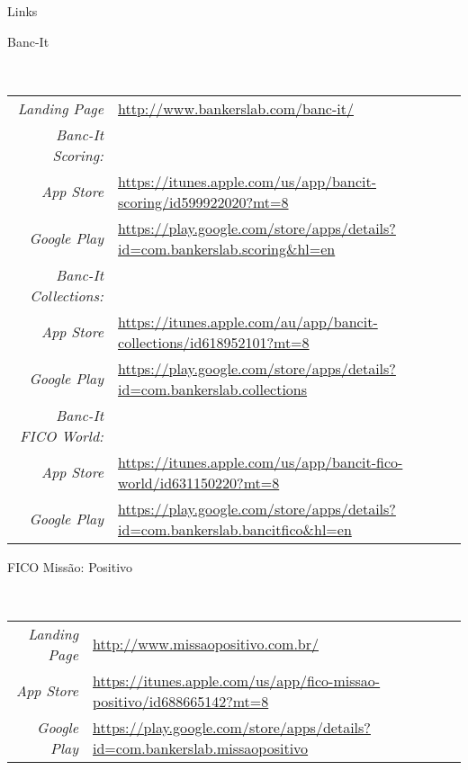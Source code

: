 \documentclass[a4paper,10pt]{article}
\begin{document}
\newpage
\par{\centering\LARGE{Links} \par}
\hfill
\par{\centering\Large \hypertarget{bancit-links}{Banc-It}\par}
\hrulefill\\
\newline
\begin{tabular}{rl}
    \textit{Landing Page} & \url{http://www.bankerslab.com/banc-it/}\\
    \textit{Banc-It Scoring:}\\
        \textit{App Store} & \small \url{https://itunes.apple.com/us/app/bancit-scoring/id599922020?mt=8}\\
        \textit{Google Play} & \small \url{https://play.google.com/store/apps/details?id=com.bankerslab.scoring\&hl=en}\\
    \textit{Banc-It Collections:}\\
        \textit{App Store} & \small \url{https://itunes.apple.com/au/app/bancit-collections/id618952101?mt=8}\\
        \textit{Google Play} & \small \url{https://play.google.com/store/apps/details?id=com.bankerslab.collections}\\
    \textit{Banc-It FICO World:}\\
        \textit{App Store} & \small \url{https://itunes.apple.com/us/app/bancit-fico-world/id631150220?mt=8}\\
        \textit{Google Play} & \small \url{https://play.google.com/store/apps/details?id=com.bankerslab.bancitfico&hl=en}
\end{tabular}


\hfill
\par{\centering\Large \hypertarget{fico-links}{FICO Missão: Positivo}\par}
\hrulefill\\
\newline
\begin{tabular}{rl}
    \textit{Landing Page} & \url{http://www.missaopositivo.com.br/}\\
    \textit{App Store} & \small \url{https://itunes.apple.com/us/app/fico-missao-positivo/id688665142?mt=8}\\
    \textit{Google Play} & \small \url{https://play.google.com/store/apps/details?id=com.bankerslab.missaopositivo}
\end{tabular}
\end{document}
